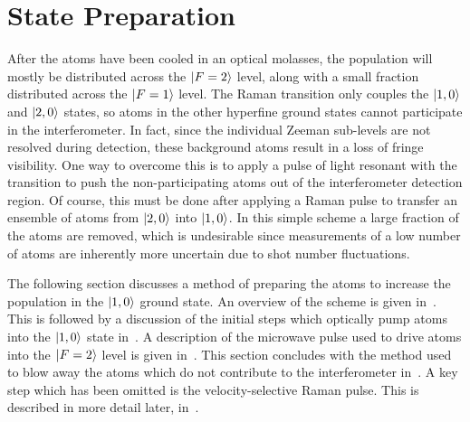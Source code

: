 \section{State Preparation}\label{sec:state_prep}
After the atoms have been cooled in an optical molasses, the
population will mostly be distributed across the \(\ket{F=2}\) level,
along with a small fraction distributed across the \(\ket{F=1}\)
level. The Raman transition only couples the \(\ket{1,0}\) and
\(\ket{2,0}\) states, so atoms in the other hyperfine ground states
cannot participate in the interferometer. In fact, since the
individual Zeeman sub-levels are not resolved during detection, these
background atoms result in a loss of fringe visibility. One way to
overcome this is to apply a pulse of light resonant with the
 transition to push the non-participating atoms out of the
interferometer detection region. Of course, this must be done after
applying a Raman pulse to transfer an ensemble of atoms from
\(\ket{2,0}\) into \(\ket{1,0}\). In this simple scheme a large
fraction of the atoms are removed, which is undesirable since
measurements of a low number of atoms are inherently more uncertain
due to shot number fluctuations. 
\par\noindent
The following section discusses a method of preparing the atoms to
increase the population in the \(\ket{1,0}\) ground state. An overview
of the scheme is given in~. This is
followed by a discussion of the initial steps which optically pump
atoms into the \(\ket{1,0}\) state
in~. A description of the microwave
pulse used to drive atoms into the \(\ket{F=2}\) level is given
in~. This section concludes with the
method used to blow away the atoms which do not contribute to the
interferometer in~. A key step which has
been omitted is the velocity-selective Raman pulse. This is described
in more detail later, in~.
